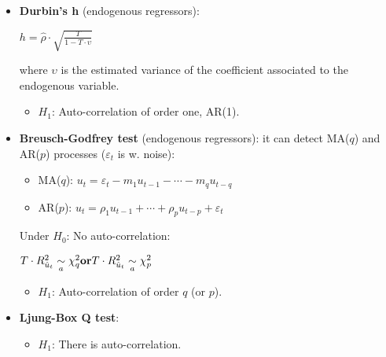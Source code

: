 \documentclass[10pt, a4paper, landscape]{article}
\begin{document}
\begin{multicols}{3}
\begin{itemize}[leftmargin=*]
\begin{itemize}[leftmargin=*]
				\item \textbf{Durbin's h} (endogenous regressors):
				
				\begin{center}
					$h = \hat{\rho} \cdot \sqrt{\frac{T}{1 - T \cdot \upsilon}}$
				\end{center}
				
				where $\upsilon$ is the estimated variance of the coefficient associated to the endogenous variable.
				
				\begin{itemize}[leftmargin=*]
					\item $H_{1}$: Auto-correlation of order one, AR(1).
				\end{itemize}
				
				\item \textbf{Breusch-Godfrey test} (endogenous regressors): it can detect MA($q$) and AR($p$) processes ($\varepsilon_{t}$ is w. noise):
				
				\begin{itemize}[leftmargin=*]
					\item MA($q$): $u_{t} = \varepsilon_{t} - m_{1} u_{t - 1} - \cdots - m_{q} u_{t - q}$
					\item AR($p$): $u_{t} = \rho_{1} u_{t - 1} + \cdots + \rho_{p} u_{t - p}+ \varepsilon_{t}$
				\end{itemize}
				
			\columnbreak
				
				Under $H_{0}$: No auto-correlation:
				
				\begin{center}
					$\hfill T \cdot R^{2}_{\hat{u}_t}\underset{a}{\sim}\chi^{2}_{q} \hfill \textbf{or} \hfill T \cdot R^{2}_{\hat{u}_t}\underset{a}{\sim}\chi^{2}_{p} \hfill$
				\end{center}
				
				\begin{itemize}[leftmargin=*]
					\item $H_{1}$: Auto-correlation of order $q$ (or $p$).
				\end{itemize}
				
				\item \textbf{Ljung-Box Q test}:
				
				\begin{itemize}[leftmargin=*]
					\item $H_{1}$: There is auto-correlation.
				\end{itemize}
			\end{itemize}
		\end{itemize}
		

\end{multicols}
\end{document}
